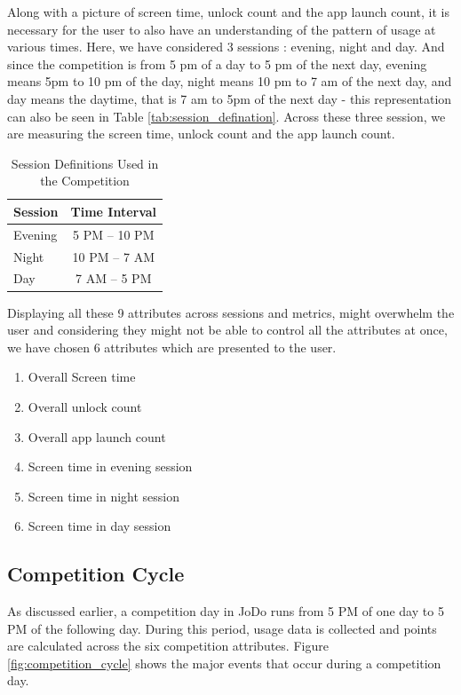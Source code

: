 \documentclass[11pt]{report}
\begin{document}
Along with a picture of screen time, unlock count and the app launch count, it is necessary for the user to also have an understanding of the pattern of usage at various times. 
Here, we have considered 3 sessions : evening, night and day. And since the competition is from 5 pm of a day to 5 pm of the next day, evening means 5pm to 10 pm of the day, night means 10 pm to 7 am of the next day, and day means the daytime, that is 7 am to 5pm of the next day - this representation can also be seen in Table \ref{tab:session_defination}.
Across these three session, we are measuring the screen time, unlock count and the app launch count. 


\begin{table}[H]
\centering
\caption{Session Definitions Used in the Competition}
\label{tab:session_definition}
\begin{tabular}{|l|c|}
\hline
\textbf{Session} & \textbf{Time Interval} \\
\hline
Evening & 5 PM -- 10 PM \\
\hline
Night & 10 PM -- 7 AM \\
\hline
Day & 7 AM -- 5 PM \\
\hline
\end{tabular}
\end{table}


Displaying all these 9 attributes across sessions and metrics, might overwhelm the user and considering they might not be able to control all the attributes at once, we have chosen 6 attributes which are presented to the user.
\begin{enumerate}
  \item Overall Screen time
  \item Overall unlock count
  \item Overall app launch count
  \item Screen time in evening session
  \item Screen time in night session
  \item Screen time in day session
\end{enumerate}

\subsection{Competition Cycle}

As discussed earlier, a competition day in JoDo runs from 5 PM of one day to 5 PM of the 
following day. During this period, usage data is collected and points are calculated 
across the six competition attributes. Figure \ref{fig:competition_cycle} shows the major 
events that occur during a competition day.
\end{document}
